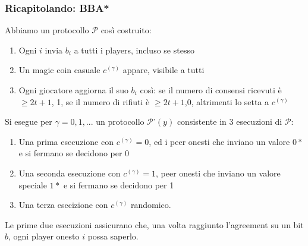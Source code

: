 \documentclass[11pt]{article}
\begin{document}
\subsubsection{Ricapitolando: BBA*}
Abbiamo un protocollo $\mathcal{P}$ così costruito:
\begin{enumerate}
    \item Ogni $i$ invia $b_i$ a tutti i players, incluso se stesso
    \item Un magic coin casuale $c^{(\gamma)}$ appare, visibile a tutti
    \item Ogni giocatore aggiorna il suo $b_i$ così: se il numero di consensi ricevuti è $\ge 2t+1$, 1, se il numero di rifiuti è $\ge 2t+1$,0, altrimenti lo setta a $c^{(\gamma)}$
\end{enumerate}
Si esegue per $\gamma=0,1,...$ un protocollo $\mathcal{P}$'$(y)$ consistente in 3 esecuzioni di $\mathcal{P}$:
\begin{enumerate}
    \item Una prima esecuzione con $c^{(\gamma)}=0$, ed i peer onesti che inviano un valore $0*$ e si fermano se decidono per 0
    \item Una seconda esecuzione con $c^{(\gamma)}=1$, peer onesti che inviano un valore speciale $1*$ e si fermano se decidono per 1
    \item Una terza esecizione con $c^{(\gamma)}$ randomico.
\end{enumerate}
Le prime due esecuzioni assicurano che, una volta raggiunto l'agreement su un bit $b$, ogni player onesto $i$ possa saperlo. 
\end{document}

